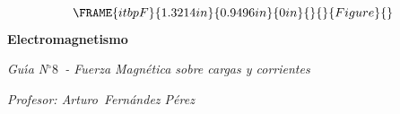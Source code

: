 \documentclass[12pt]{article}
\begin{document}
\begin{center}
\begin{equation*}
\FRAME{itbpF}{1.3214in}{0.9496in}{0in}{}{}{Figure}{\special{language
"Scientific Word";type "GRAPHIC";maintain-aspect-ratio TRUE;display
"USEDEF";valid_file "T";width 1.3214in;height 0.9496in;depth
0in;original-width 1.3552in;original-height 0.9669in;cropleft "0";croptop
"1";cropright "1";cropbottom "0";tempfilename
'R2D0SD00.bmp';tempfile-properties "XPR";}}
\end{equation*}%
\textbf{Electromagnetismo}

\emph{Gu\'{\i}a N}$%
{{}^\circ}%
8$\emph{\ - Fuerza Magn\'{e}tica sobre cargas y corrientes}

\textit{Profesor: Arturo\ Fern\'{a}ndez P\'{e}rez}
\end{center}
\end{document}
